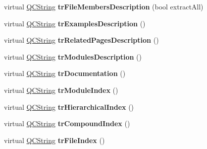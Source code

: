 \begin{DoxyCompactItemize}
virtual \mbox{\hyperlink{class_q_c_string}{Q\+C\+String}} {\bfseries tr\+File\+Members\+Description} (bool extract\+All)
\item 
\mbox{\label{class_translator_chinese_a5f39dcec9fccd6083bed00de3b3178f3}} 
virtual \mbox{\hyperlink{class_q_c_string}{Q\+C\+String}} {\bfseries tr\+Examples\+Description} ()
\item 
\mbox{\label{class_translator_chinese_a26f4d893258a89efd02affe8c7ef5b4a}} 
virtual \mbox{\hyperlink{class_q_c_string}{Q\+C\+String}} {\bfseries tr\+Related\+Pages\+Description} ()
\item 
\mbox{\label{class_translator_chinese_a95ed343764396074d40392934529a35a}} 
virtual \mbox{\hyperlink{class_q_c_string}{Q\+C\+String}} {\bfseries tr\+Modules\+Description} ()
\item 
\mbox{\label{class_translator_chinese_afb3e448d080937829871feded3fe0235}} 
virtual \mbox{\hyperlink{class_q_c_string}{Q\+C\+String}} {\bfseries tr\+Documentation} ()
\item 
\mbox{\label{class_translator_chinese_af40c7d415886428914e68a26905d639e}} 
virtual \mbox{\hyperlink{class_q_c_string}{Q\+C\+String}} {\bfseries tr\+Module\+Index} ()
\item 
\mbox{\label{class_translator_chinese_a90097aede8934a73ca0c098fa29a7686}} 
virtual \mbox{\hyperlink{class_q_c_string}{Q\+C\+String}} {\bfseries tr\+Hierarchical\+Index} ()
\item 
\mbox{\label{class_translator_chinese_abe80b117e8ae324e9d7bc3cb41844862}} 
virtual \mbox{\hyperlink{class_q_c_string}{Q\+C\+String}} {\bfseries tr\+Compound\+Index} ()
\item 
\mbox{\label{class_translator_chinese_ac278d7c8196a6f831decf5bf89ae6c69}} 
virtual \mbox{\hyperlink{class_q_c_string}{Q\+C\+String}} {\bfseries tr\+File\+Index} ()
\item 
\mbox{\label{class_translator_chinese_afe0debe587e71a39c78e67970ba825b7}} 

\end{DoxyCompactItemize}
